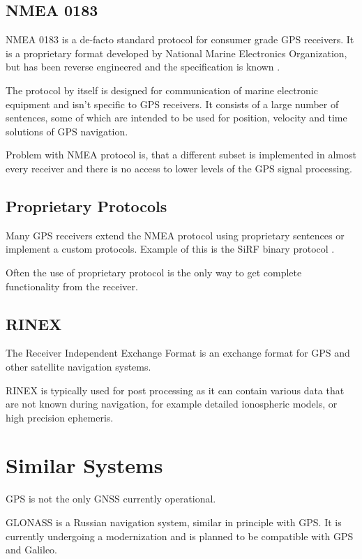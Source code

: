 \subsection{NMEA 0183}
NMEA 0183 is a de-facto standard protocol for consumer grade GPS receivers.
It is a proprietary format developed by National Marine Electronics Organization,
but has been reverse engineered and the specification is known \cite{depriest}.

The protocol by itself is designed for communication of marine electronic
equipment and isn't specific to GPS receivers.
It consists of a large number of sentences, some of which are intended to be used
for position, velocity and time solutions of GPS navigation.

Problem with NMEA protocol is, that a different subset is implemented in almost every
receiver and there is no access to lower levels of the GPS signal processing.

\subsection{Proprietary Protocols}
Many GPS receivers extend the NMEA protocol using proprietary sentences or
implement a custom protocols.
Example of this is the SiRF binary protocol \cite{sirf-protocol}.

Often the use of proprietary protocol is the only way to get complete functionality from
the receiver.

\subsection{RINEX}

The Receiver Independent Exchange Format \cite{rinex-format} is an exchange format
for GPS and other satellite navigation systems.

RINEX is typically used for post processing as it can contain various data that are not
known during navigation, for example detailed ionospheric models, or high precision ephemeris.

\section{Similar Systems}

GPS is not the only GNSS currently operational.

GLONASS \cite{glonass} is a Russian navigation system, similar in principle with GPS.
It is currently undergoing a modernization and is planned to be compatible with GPS and Galileo.

